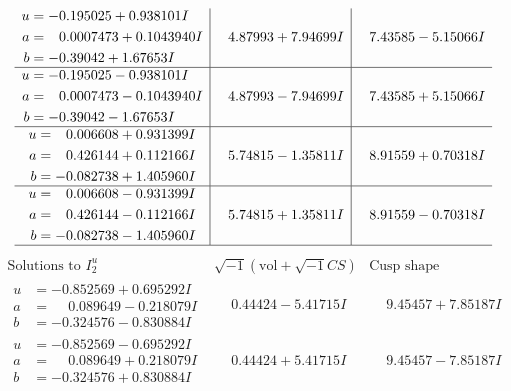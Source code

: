 \documentclass[1p]{elsarticle_modified}
\theoremstyle{definition}
\newcommand{\I}{\sqrt{-1}}
\begin{document}
$$\begin{array}{c|c|c}
\begin{aligned}
u &= -0.195025 + 0.938101 I \\
a &= \phantom{-}0.0007473 + 0.1043940 I \\
b &= -0.39042 + 1.67653 I\end{aligned}
 & \phantom{-}4.87993 + 7.94699 I & \phantom{-}7.43585 - 5.15066 I \\ \hline\begin{aligned}
u &= -0.195025 - 0.938101 I \\
a &= \phantom{-}0.0007473 - 0.1043940 I \\
b &= -0.39042 - 1.67653 I\end{aligned}
 & \phantom{-}4.87993 - 7.94699 I & \phantom{-}7.43585 + 5.15066 I \\ \hline\begin{aligned}
u &= \phantom{-}0.006608 + 0.931399 I \\
a &= \phantom{-}0.426144 + 0.112166 I \\
b &= -0.082738 + 1.405960 I\end{aligned}
 & \phantom{-}5.74815 - 1.35811 I & \phantom{-}8.91559 + 0.70318 I \\ \hline\begin{aligned}
u &= \phantom{-}0.006608 - 0.931399 I \\
a &= \phantom{-}0.426144 - 0.112166 I \\
b &= -0.082738 - 1.405960 I\end{aligned}
 & \phantom{-}5.74815 + 1.35811 I & \phantom{-}8.91559 - 0.70318 I\\
 \hline 
 \end{array}$$\newpage$$\begin{array}{c|c|c}  
\text{Solutions to }I^u_{2}& \I (\text{vol} + \sqrt{-1}CS) & \text{Cusp shape}\\
 \hline 
\begin{aligned}
u &= -0.852569 + 0.695292 I \\
a &= \phantom{-}0.089649 - 0.218079 I \\
b &= -0.324576 - 0.830884 I\end{aligned}
 & \phantom{-}0.44424 - 5.41715 I & \phantom{-}9.45457 + 7.85187 I \\ \hline\begin{aligned}
u &= -0.852569 - 0.695292 I \\
a &= \phantom{-}0.089649 + 0.218079 I \\
b &= -0.324576 + 0.830884 I\end{aligned}
 & \phantom{-}0.44424 + 5.41715 I & \phantom{-}9.45457 - 7.85187 I \\ \hline\begin{aligned}

\end{aligned}
\end{array}$$
\end{document}
